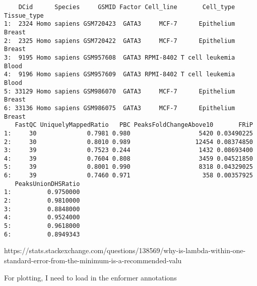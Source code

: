 \documentclass[
  letterpaper,
  DIV=11,
  numbers=noendperiod]{scrartcl}
\newenvironment{Shaded}{\begin{snugshade}}{\end{snugshade}}
\newcommand{\FunctionTok}[1]{\textcolor[rgb]{0.28,0.35,0.67}{#1}}
\newcommand{\NormalTok}[1]{\textcolor[rgb]{0.00,0.23,0.31}{#1}}
\newcommand{\OtherTok}[1]{\textcolor[rgb]{0.00,0.23,0.31}{#1}}
\newcommand{\SpecialCharTok}[1]{\textcolor[rgb]{0.37,0.37,0.37}{#1}}
\newcommand{\StringTok}[1]{\textcolor[rgb]{0.13,0.47,0.30}{#1}}
\begin{document}
\begin{Shaded}
\end{Shaded}

\begin{verbatim}
    DCid      Species     GSMID Factor Cell_line       Cell_type Tissue_type
1:  2324 Homo sapiens GSM720423  GATA3     MCF-7      Epithelium      Breast
2:  2325 Homo sapiens GSM720422  GATA3     MCF-7      Epithelium      Breast
3:  9195 Homo sapiens GSM957608  GATA3 RPMI-8402 T cell leukemia       Blood
4:  9196 Homo sapiens GSM957609  GATA3 RPMI-8402 T cell leukemia       Blood
5: 33129 Homo sapiens GSM986070  GATA3     MCF-7      Epithelium      Breast
6: 33136 Homo sapiens GSM986075  GATA3     MCF-7      Epithelium      Breast
   FastQC UniquelyMappedRatio   PBC PeaksFoldChangeAbove10       FRiP
1:     30              0.7981 0.980                   5420 0.03490225
2:     30              0.8010 0.989                  12454 0.08374850
3:     39              0.7523 0.244                   1432 0.08693400
4:     39              0.7604 0.808                   3459 0.04521850
5:     39              0.8001 0.990                   8318 0.04329025
6:     39              0.7460 0.971                    358 0.00357925
   PeaksUnionDHSRatio
1:          0.9750000
2:          0.9810000
3:          0.8848000
4:          0.9524000
5:          0.9618000
6:          0.8949343
\end{verbatim}

https://stats.stackexchange.com/questions/138569/why-is-lambda-within-one-standard-error-from-the-minimum-is-a-recommended-valu

\newpage

For plotting, I need to load in the enformer annotations
\end{document}
